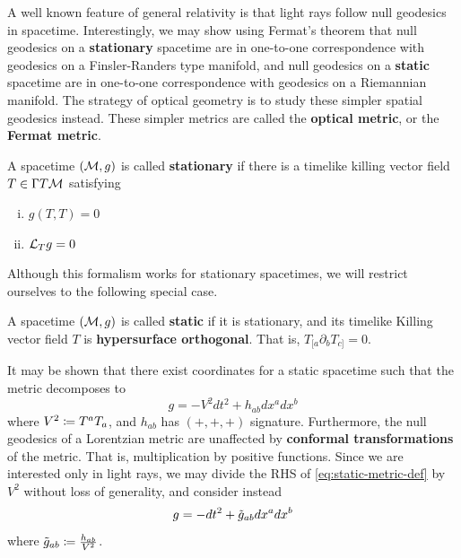 %
A well known feature of general relativity is that light rays follow null geodesics in spacetime.
Interestingly, we may show using Fermat's theorem \cite{PerlickV1990OFpi} that null geodesics on a \textbf{stationary} spacetime are in one-to-one correspondence with geodesics on a Finsler-Randers type manifold, and null geodesics on a \textbf{static} spacetime are in one-to-one correspondence with geodesics on a Riemannian manifold. The strategy of optical geometry is to study these simpler spatial geodesics instead. These simpler metrics are called the \textbf{optical metric}, or the \textbf{Fermat metric}.

\begin{definition}[]\label{}
A spacetime $(\mathcal{M}, g)$ is called \textbf{stationary} if there is a timelike killing vector field $T \in \Gamma T \mathcal{M}$ satisfying
%
\begin{enumerate}[i)]
  \item $g(T, T) = 0$
  \item $\mathcal{L}_Tg = 0$
\end{enumerate}
\end{definition}
%
Although this formalism works for stationary spacetimes, we will restrict ourselves to the following special case.
%
\begin{definition}[]\label{}
A spacetime $(\mathcal{M}, g)$ is called \textbf{static} if it is stationary, and its timelike Killing vector field $T$ is \textbf{hypersurface orthogonal}. That is, $T_{[a} \partial_b T_{c]} = 0$.
\end{definition}
\begin{remark}\label{}
It may be shown \cite{straumann2012general} that there exist coordinates for a static spacetime such that the metric decomposes to
\begin{equation}\label{eq:static-metric-def}
g = -V^2 dt^2 + h_{ab} dx^a dx^b
\end{equation}
where $V^2 \coloneqq T^a T_a$, and $h_{ab}$ has $(+, +, +)$ signature.
Furthermore, the null geodesics of a Lorentzian metric are unaffected by \textbf{conformal transformations} of the metric. That is, multiplication by positive functions. Since we are interested only in light rays, we may divide the RHS of \cref{eq:static-metric-def} by $V^2$ without loss of generality, and consider instead
\begin{equation}\label{eq:static-metric}
g = -dt^2 + \tilde{g}_{ab} dx^a dx^b
\end{equation}
where $\tilde{g}_{ab} \coloneqq \frac{h_{ab}}{V^2}$.
\end{remark}
